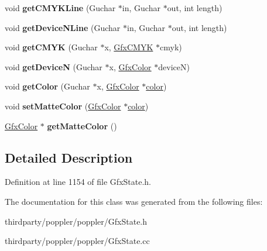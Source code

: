 \begin{DoxyCompactItemize}
void {\bfseries get\+C\+M\+Y\+K\+Line} (Guchar $\ast$in, Guchar $\ast$out, int length)
\item 
\mbox{\label{class_gfx_image_color_map_acfdaf40492349aea323af2cc8f1be1fa}} 
void {\bfseries get\+Device\+N\+Line} (Guchar $\ast$in, Guchar $\ast$out, int length)
\item 
\mbox{\label{class_gfx_image_color_map_a806b580bb1eb4e7a56051a65518737a1}} 
void {\bfseries get\+C\+M\+YK} (Guchar $\ast$x, \hyperlink{struct_gfx_c_m_y_k}{Gfx\+C\+M\+YK} $\ast$cmyk)
\item 
\mbox{\label{class_gfx_image_color_map_a24806692331a442b07abccdca732601d}} 
void {\bfseries get\+DeviceN} (Guchar $\ast$x, \hyperlink{struct_gfx_color}{Gfx\+Color} $\ast$deviceN)
\item 
\mbox{\label{class_gfx_image_color_map_ac945e06a20039e26a0878ae2932d427f}} 
void {\bfseries get\+Color} (Guchar $\ast$x, \hyperlink{struct_gfx_color}{Gfx\+Color} $\ast$\hyperlink{structcolor}{color})
\item 
\mbox{\label{class_gfx_image_color_map_a43fd44b92d7064fe50cc90130cee555e}} 
void {\bfseries set\+Matte\+Color} (\hyperlink{struct_gfx_color}{Gfx\+Color} $\ast$\hyperlink{structcolor}{color})
\item 
\mbox{\label{class_gfx_image_color_map_a6f67d28e604b7371384a36ef1af24c9c}} 
\hyperlink{struct_gfx_color}{Gfx\+Color} $\ast$ {\bfseries get\+Matte\+Color} ()
\end{DoxyCompactItemize}


\subsection{Detailed Description}


Definition at line 1154 of file Gfx\+State.\+h.



The documentation for this class was generated from the following files\+:\begin{DoxyCompactItemize}
\item 
thirdparty/poppler/poppler/Gfx\+State.\+h\item 
thirdparty/poppler/poppler/Gfx\+State.\+cc\end{DoxyCompactItemize}
